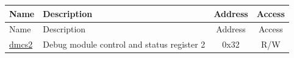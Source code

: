 \begin{longtable}{ | p{4.0cm} | p{8.4cm} | c | c| }
\hline\rowcolor{lightgray}
Name & Description & Address & Access \\ \hline
\endfirsthead
\hline
\rowcolor{lightgray}
Name & Description & Address & Access  \\
\hline
\endhead
\endfoot

\hyperref[sec:riscvcpu-dmcs2-desc]{dmcs2} & Debug module control and status register 2 & 0x32 & R/W \\\hline
\end{longtable}